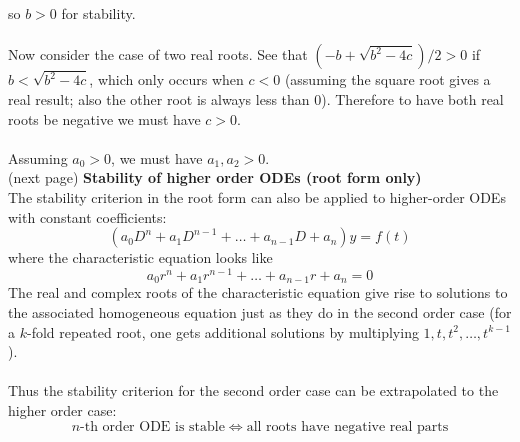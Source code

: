 \documentclass{report}
\begin{document}
so $b>0$ for stability.\\
\vspace{1mm}\\
Now consider the case of two real roots. See that $(-b+\sqrt{b^2-4c})/2>0$ if $b<\sqrt{b^2-4c}$, which only occurs
when $c<0$ (assuming the square root gives a real result; also the other root is always less than 0).
Therefore to have both real roots be negative we must have $c>0$.\\
\vspace{1mm}\\
Assuming $a_0>0$, we must have $a_1,a_2>0$.\\
(next page)
\newpage
\noindent\textbf{Stability of higher order ODEs (root form only)}\\
The stability criterion in the root form can also be applied to higher-order ODEs with constant coefficients:
\begin{equation*}
(a_0D^n+a_1D^{n-1}+\ldots+a_{n-1}D+a_n)y=f(t)
\end{equation*}
where the characteristic equation looks like
\begin{equation*}
a_0r^n+a_1r^{n-1}+\ldots+a_{n-1}r+a_n=0
\end{equation*}
The real and complex roots of the characteristic equation give rise to solutions to the associated homogeneous equation just as they do in the second order case (for a $k$-fold repeated root, one gets additional solutions by 
multiplying $1,t,t^2,\ldots,t^{k-1}$).\\
\vspace{1mm}\\
Thus the stability criterion for the second order case can be extrapolated to the higher order case:
\begin{equation*}
n\text{-th order ODE is stable}\iff\text{all roots have negative real parts}
\end{equation*}
\newpage
\end{document}

